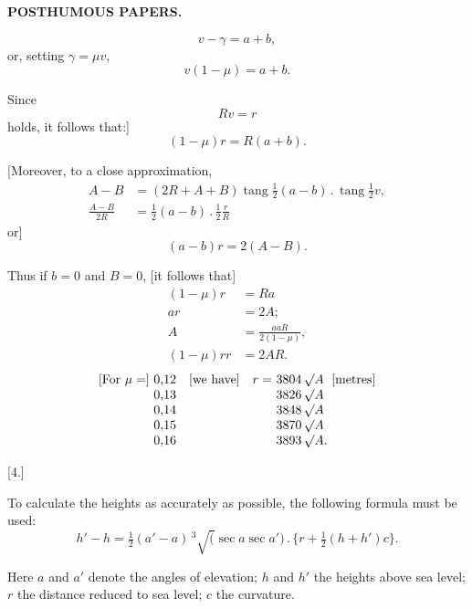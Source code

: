 \par\clearpage
\noindent{}\hfill{\small\textbf{POSTHUMOUS PAPERS.}}\hfill\null\par\medskip
\begingroup
\setlength{\abovedisplayskip}{5pt}\setlength{\belowdisplayskip}{5pt}
\[
v-\gamma=a+b,
\]
\noindent or, setting \(\gamma=\mu v\),
\[
v(1-\mu)=a+b.
\]
\par\noindent\hspace*{\parindent}Since
\[
Rv=r
\]
\noindent holds, it follows that:]
\[
(1-\mu)r=R(a+b).
\]
\par\noindent\hspace*{\parindent}[Moreover, to a close approximation,
\[
\begin{aligned}
A-B&=(2R+A+B)\operatorname{tang}\tfrac12(a-b)\mathbin{.}\operatorname{tang}\tfrac12v,\\
\tfrac{A-B}{2R}&=\tfrac12(a-b)\mathbin{.}\tfrac12\tfrac rR
\end{aligned}
\]
\noindent or]
\[
(a-b)r=2(A-B).
\]
\par\noindent\hspace*{\parindent}Thus if \(b=0\) and \(B=0\), [it follows that]
\[
\begin{aligned}
(1-\mu)r&=Ra\\
ar&=2A;\\
A&=\tfrac{aaR}{2(1-\mu)},\\
(1-\mu)rr&=2AR.
\end{aligned}
\]
\[
\begin{array}{@{}r@{\ }l@{\quad}l@{\quad}r@{\ }l@{\ }l@{}}
\text{[For }\mu=] & 0{,}12 & \text{[we have]} & r= & 3804\,\surd A & \text{[metres]}\\
 &0{,}13&&&3826\,\surd A&\\
 &0{,}14&&&3848\,\surd A&\\
 &0{,}15&&&3870\,\surd A&\\
 &0{,}16&&&3893\,\surd A.&
\end{array}
\]
\par\medskip
\begin{center}
[4.]\par{}
\end{center}
\par\noindent\hspace*{\parindent}To calculate the heights as accurately as possible, the following formula must be used:
\[
h'-h=\tfrac12(a'-a)\,{}^3\!\surd(\sec a\sec a')\mathbin{.}\{r+\tfrac12(h+h')c\}.
\]
\par\noindent\hspace*{\parindent}Here \(a\) and \(a'\) denote the angles of elevation; \(h\) and \(h'\) the heights above
sea level; \(r\) the distance reduced to sea level; \(c\) the curvature.
\endgroup

